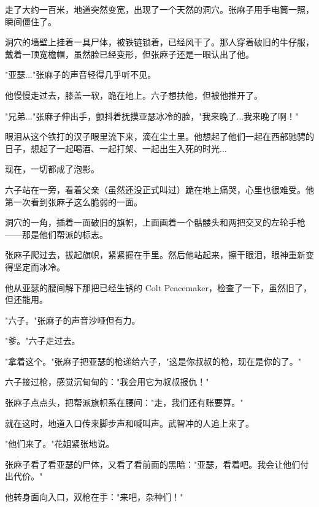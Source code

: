 走了大约一百米，地道突然变宽，出现了一个天然的洞穴。张麻子用手电筒一照，瞬间僵住了。

洞穴的墙壁上挂着一具尸体，被铁链锁着，已经风干了。那人穿着破旧的牛仔服，戴着一顶宽檐帽，虽然脸已经变形，但张麻子还是一眼认出了他。

"亚瑟..."张麻子的声音轻得几乎听不见。

他慢慢走过去，膝盖一软，跪在地上。六子想扶他，但被他推开了。

"兄弟..."张麻子伸出手，颤抖着抚摸亚瑟冰冷的脸，"我来晚了...我来晚了啊！"

眼泪从这个铁打的汉子眼里流下来，滴在尘土里。他想起了他们一起在西部驰骋的日子，想起了一起喝酒、一起打架、一起出生入死的时光...

现在，一切都成了泡影。

六子站在一旁，看着父亲（虽然还没正式叫过）跪在地上痛哭，心里也很难受。他第一次看到张麻子这么脆弱的一面。

洞穴的一角，插着一面破旧的旗帜，上面画着一个骷髅头和两把交叉的左轮手枪——那是他们帮派的标志。

张麻子爬过去，拔起旗帜，紧紧握在手里。然后他站起来，擦干眼泪，眼神重新变得坚定而冰冷。

他从亚瑟的腰间解下那把已经生锈的 Colt Peacemaker，检查了一下，虽然旧了，但还能用。

"六子。"张麻子的声音沙哑但有力。

"爹。"六子走过去。

"拿着这个。"张麻子把亚瑟的枪递给六子，"这是你叔叔的枪，现在是你的了。"

六子接过枪，感觉沉甸甸的："我会用它为叔叔报仇！"

张麻子点点头，把帮派旗帜系在腰间："走，我们还有账要算。"

就在这时，地道入口传来脚步声和喊叫声。武智冲的人追上来了。

"他们来了。"花姐紧张地说。

张麻子看了看亚瑟的尸体，又看了看前面的黑暗："亚瑟，看着吧。我会让他们付出代价。"

他转身面向入口，双枪在手："来吧，杂种们！"